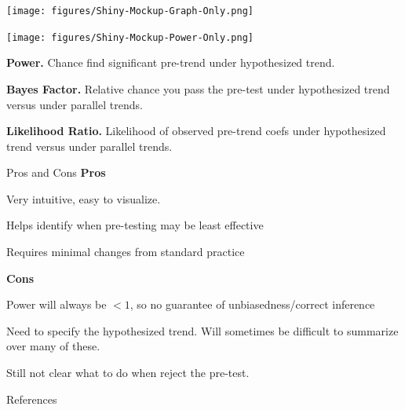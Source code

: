 \documentclass[aspectratio = 169, 13pt]{beamer}
\begin{document}
\begin{frame}
	\centering
	\texttt{[image: figures/Shiny-Mockup-Graph-Only.png]}   
\end{frame}

\begin{frame}
	\centering
	\texttt{[image: figures/Shiny-Mockup-Power-Only.png]} 
	\begin{wideitemize}
		\item
		\textbf{Power.} Chance find significant pre-trend under hypothesized trend.
		\item
		\textbf{Bayes Factor.} Relative chance you pass the pre-test under hypothesized trend versus under parallel trends.
		\item
		\textbf{Likelihood Ratio.} Likelihood of observed pre-trend coefs under hypothesized trend versus under parallel trends.
	\end{wideitemize}
\end{frame}

\begin{frame}{Pros and Cons}
	\textbf{Pros}
	\begin{wideitemize}
		\item
		Very intuitive, easy to visualize.
		
		\item
		Helps identify when pre-testing may be least effective
		    
		\item
		Requires minimal changes from standard practice
	\end{wideitemize}
	
	\textbf{Cons}
	
	\begin{wideitemize}
		\item
		Power will always be $<1$, so no guarantee of unbiasedness/correct inference
		    
		\item
		Need to specify the hypothesized trend. Will sometimes be difficult to summarize over many of these.
		    
		\item
		Still not clear what to do when reject the pre-test.
	\end{wideitemize}
	    
\end{frame}

\begin{frame}{References}
	\nocite{rambachan_honest_2021}
	
\end{frame}
\end{document}
